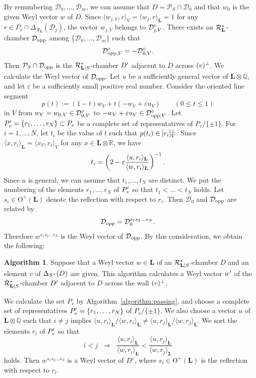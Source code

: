 \documentclass{amsart}
\theoremstyle{plain}
\theoremstyle{definition}
\newtheorem{algorithm}[theorem]{Algorithm}
\theoremstyle{remark}
\numberwithin{equation}{section}
\numberwithin{table}{section}
\numberwithin{figure}{section}
\newcommand{\Q}{\mathord{\mathbb  Q}}
\newcommand{\R}{\mathord{\mathbb R}}
\newcommand{\DDD}{\mathord{\mathcal D}}
\newcommand{\PPP}{\mathord{\mathcal P}}
\newcommand{\RRR}{\mathord{\mathcal R}}
\newcommand{\tensor}{\otimes}
\newcommand{\inv}{\sp{-1}}
\newcommand{\sprime}{\sp\prime}
\newcommand{\spcirc}{\sp{\mathord{\circ}}}
\newcommand{\sperp}{\sp{\perp}}
\newcommand{\dual}{\sp{\vee}}
\newcommand{\OG}{\mathord{\mathrm {O}}}
\renewcommand{\L}{\mathord{\mathbf{L}}}
\newcommand{\intM}[2]{\langle{#1}\rangle_{#2}}
\newcommand{\Roots}{\RRR}
\newcommand{\sphyp}{\sp*}
\newcommand{\RtsLS}{\Roots_{\L|S}}
\newcommand{\opp}{\mathord{{\rm opp}}}
\begin{document}
By renumbering $\DDD_0, \dots, \DDD_m$,
we can assume that
$D=\PPP_S\cap \DDD_0$ and  
that $w_0$ is the given Weyl vector $w$ of $D$.
Since 
$\intM{w_{j,V}, r}{V}=\intM{w_{j}, r}{\L}=1$
for any $r\in P_v\cap\Delta_{\Roots_{\L}}(\DDD_j)$,
the vector $w_{j, V}$ belongs to  $\DDD\spcirc_{j, V}$.
There exists an $\Roots_{\L}\sphyp$-chamber $\DDD_{\opp}$ among $\{\DDD_0, \dots, \DDD_m\}$ such that
$$
\DDD\spcirc_{\opp, V}=-\DDD\spcirc_{0, V}.
$$
Then 
$\PPP_S\cap \DDD_{\opp}$
is the $\RtsLS\sphyp$-chamber  $D\sprime$ adjacent to $D$ across $(v)\sperp$.
We calculate the Weyl vector of $\DDD_{\opp}$.
Let $u$ be a sufficiently general vector of ${\L}\tensor\Q$,
and let $\varepsilon$ be a sufficiently small positive real number.
Consider the oriented line segment
$$
p(t):=(1-t) w_V+t(-w_V+\varepsilon u_V)\qquad (0\le t\le 1)
$$
in $V$ from $w_{V}=w_{0, V}\in \DDD\spcirc_{0, V}$ 
to $-w_V+\varepsilon u_V\in \DDD\spcirc_{\opp, V}$.
Let 
$P\sprime_v=\{r_1, \dots, r_N\}\subset P_v$
be a complete set of representatives
of  $P_v/\{\pm 1\}$.
For $i=1, \dots, N$,
let $t_i$ be the value of $t$ such that $p(t_i) \in [r_i]_V\sperp$.
Since $\intM{x, r_i}{\L}=\intM{x_V, r_i}{V}$ for any
$x\in {\L}\tensor\R$,
we have
$$
t_i=\left(2-\varepsilon \frac{\intM{u, r_i}{\L}}{\intM{w, r_i}{\L}}\right)\inv.
$$
Since $u$ is general,
we can assume that $t_1, \dots, t_N$ are distinct.
We put the numbering of the elements $r_1, \dots, r_N$ of $P_v\sprime$ so that
$t_1<\dots<t_N$ holds.
Let $s_i\in \OG^+({\L})$ denote the reflection with respect to 
$r_i$.
Then $\DDD_0$ and $\DDD_{\opp}$ are related by
$$
\DDD_{\opp}=\DDD_{0}^{s_1 s_2\dots s_N}.
$$
Therefore $w^{s_1 s_2\dots s_N}$ is the Weyl vector of $\DDD_{\opp}$.
By this consideration, we obtain the following:
%
\begin{algorithm}\label{algorithm:adjacent}
Suppose that a Weyl vector $w\in\L$ of 
an $\RtsLS\sphyp$-chamber $D$ and
an element $v$ of $\Delta_{S\dual}(D)$
are  given.
This algorithm calculates a Weyl vector $w\sprime$ of 
the $\RtsLS\sphyp$-chamber $D\sprime$ adjacent to
$D$ across the wall $(v)\sperp$.
\par
We calculate the set
$P_v$
by Algorithm~\ref{algorithm:passing},
and choose  a complete set of representatives 
$P\sprime_v=\{r_1, \dots, r_N\}$
of  $P_v/\{\pm 1\}$.
We also choose a vector $u$ of ${\L}\tensor\Q$
such that $i\ne j$ implies 
${\intM{u, r_i}{\L}}/{\intM{w, r_i}{\L}} \ne  {\intM{u, r_j}{\L}}/{\intM{w, r_j}{\L}}$.
We sort the elements $r_i$  of $P\sprime_v$ so that
$$
i<j\;\;\Longrightarrow\;\;  
\frac{\intM{u, r_i}{\L}}{\intM{w, r_i}{\L}} <  \frac{\intM{u, r_j}{\L}}{\intM{w, r_j}{\L}}
$$
holds.
Then  $w^{s_1 s_2\dots s_N}$
is a Weyl vector of $D\sprime$,
where $s_i\in \OG^+(\L)$ is the reflection with respect to 
$r_i$.
\end{algorithm}
%
\end{document}

